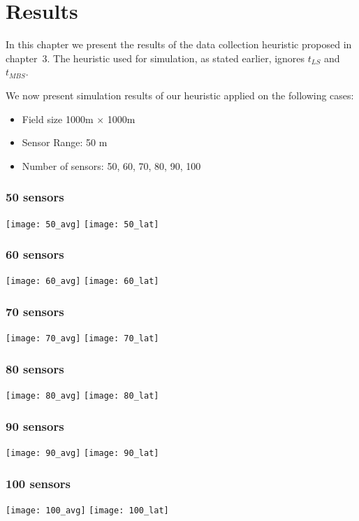 \chapter{Results}

In this chapter we present the results of the data collection heuristic
proposed in chapter~3. The heuristic used for simulation, as stated 
earlier, ignores $t_{LS}$ and $t_{MBS}$. %

We now present simulation results of our heuristic applied on the following cases:
\begin{itemize}
\item Field size 1000m $\times$ 1000m
\item Sensor Range: 50 m
\item Number of sensors: 50, 60, 70, 80, 90, 100
\end{itemize}

\subsection{50 sensors}
\texttt{[image: 50\_avg]}
\texttt{[image: 50\_lat]}

\subsection{60 sensors}
\texttt{[image: 60\_avg]}
\texttt{[image: 60\_lat]}

\subsection{70 sensors}
\texttt{[image: 70\_avg]}
\texttt{[image: 70\_lat]}

\subsection{80 sensors}
\texttt{[image: 80\_avg]}
\texttt{[image: 80\_lat]}

\subsection{90 sensors}
\texttt{[image: 90\_avg]}
\texttt{[image: 90\_lat]}

\subsection{100 sensors}
\texttt{[image: 100\_avg]}
\texttt{[image: 100\_lat]}
